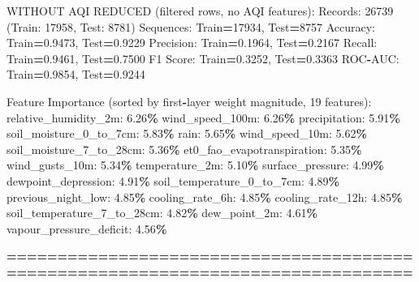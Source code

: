\documentclass[
  letterpaper,
  DIV=11,
  numbers=noendperiod]{scrartcl}
\newenvironment{Shaded}{\begin{snugshade}}{\end{snugshade}}
\newcommand{\BuiltInTok}[1]{#1}
\newcommand{\DecValTok}[1]{\textcolor[rgb]{0.00,0.00,0.81}{#1}}
\newcommand{\FloatTok}[1]{\textcolor[rgb]{0.00,0.00,0.81}{#1}}
\newcommand{\NormalTok}[1]{#1}
\newcommand{\OperatorTok}[1]{\textcolor[rgb]{0.81,0.36,0.00}{\textbf{#1}}}
\begin{document}
\begin{Shaded}
\begin{Highlighting}[]
\NormalTok{WITHOUT AQI REDUCED (filtered rows, no AQI features):}
\NormalTok{  Records: }\DecValTok{26739}\NormalTok{ (Train: }\DecValTok{17958}\NormalTok{, Test: }\DecValTok{8781}\NormalTok{)}
\NormalTok{  Sequences: Train}\OperatorTok{=}\DecValTok{17934}\NormalTok{, Test}\OperatorTok{=}\DecValTok{8757}
\NormalTok{  Accuracy: Train}\OperatorTok{=}\FloatTok{0.9473}\NormalTok{, Test}\OperatorTok{=}\FloatTok{0.9229}
\NormalTok{  Precision: Train}\OperatorTok{=}\FloatTok{0.1964}\NormalTok{, Test}\OperatorTok{=}\FloatTok{0.2167}
\NormalTok{  Recall: Train}\OperatorTok{=}\FloatTok{0.9461}\NormalTok{, Test}\OperatorTok{=}\FloatTok{0.7500}
\NormalTok{  F1 Score: Train}\OperatorTok{=}\FloatTok{0.3252}\NormalTok{, Test}\OperatorTok{=}\FloatTok{0.3363}
\NormalTok{  ROC}\OperatorTok{{-}}\NormalTok{AUC: Train}\OperatorTok{=}\FloatTok{0.9854}\NormalTok{, Test}\OperatorTok{=}\FloatTok{0.9244}

\NormalTok{  Feature Importance (}\BuiltInTok{sorted}\NormalTok{ by first}\OperatorTok{{-}}\NormalTok{layer weight magnitude, }\DecValTok{19}\NormalTok{ features):}
\NormalTok{    relative\_humidity\_2m: }\FloatTok{6.26}\OperatorTok{\%}
\NormalTok{    wind\_speed\_100m: }\FloatTok{6.26}\OperatorTok{\%}
\NormalTok{    precipitation: }\FloatTok{5.91}\OperatorTok{\%}
\NormalTok{    soil\_moisture\_0\_to\_7cm: }\FloatTok{5.83}\OperatorTok{\%}
\NormalTok{    rain: }\FloatTok{5.65}\OperatorTok{\%}
\NormalTok{    wind\_speed\_10m: }\FloatTok{5.62}\OperatorTok{\%}
\NormalTok{    soil\_moisture\_7\_to\_28cm: }\FloatTok{5.36}\OperatorTok{\%}
\NormalTok{    et0\_fao\_evapotranspiration: }\FloatTok{5.35}\OperatorTok{\%}
\NormalTok{    wind\_gusts\_10m: }\FloatTok{5.34}\OperatorTok{\%}
\NormalTok{    temperature\_2m: }\FloatTok{5.10}\OperatorTok{\%}
\NormalTok{    surface\_pressure: }\FloatTok{4.99}\OperatorTok{\%}
\NormalTok{    dewpoint\_depression: }\FloatTok{4.91}\OperatorTok{\%}
\NormalTok{    soil\_temperature\_0\_to\_7cm: }\FloatTok{4.89}\OperatorTok{\%}
\NormalTok{    previous\_night\_low: }\FloatTok{4.85}\OperatorTok{\%}
\NormalTok{    cooling\_rate\_6h: }\FloatTok{4.85}\OperatorTok{\%}
\NormalTok{    cooling\_rate\_12h: }\FloatTok{4.85}\OperatorTok{\%}
\NormalTok{    soil\_temperature\_7\_to\_28cm: }\FloatTok{4.82}\OperatorTok{\%}
\NormalTok{    dew\_point\_2m: }\FloatTok{4.61}\OperatorTok{\%}
\NormalTok{    vapour\_pressure\_deficit: }\FloatTok{4.56}\OperatorTok{\%}

\OperatorTok{================================================================================}


\end{Highlighting}
\end{Shaded}
\end{document}
